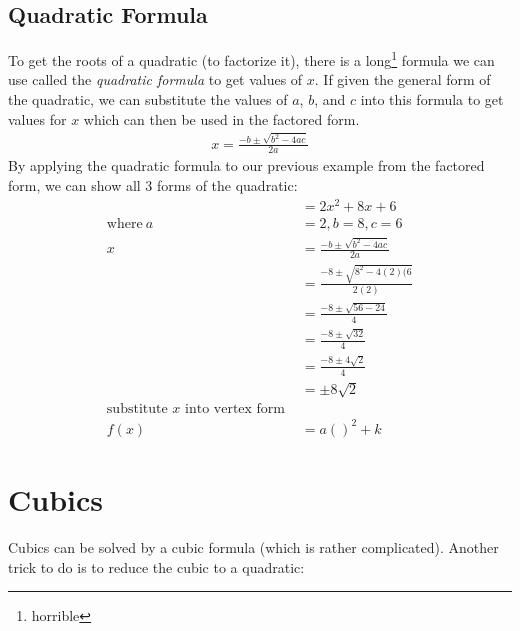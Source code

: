 \subsection{Quadratic Formula}
To get the roots of a quadratic (to factorize it), there is a
long\footnote{horrible} formula we can use called the \emph{quadratic formula}
to get values of $x$. If given the general form of the quadratic, we can
substitute the values of $a$, $b$, and $c$ into this formula to get values for
$x$ which can then be used in the factored form.
\begin{align}
  x = \frac{-b \pm \sqrt{b^2 - 4ac}}{2a}
\end{align}
By applying the quadratic formula to our previous example from the factored
form, we can show all 3 forms of the quadratic:
\begin{align}
  & = 2x^2 + 8x + 6 \nonumber \\
  \text{where}~ a & = 2, b = 8, c = 6 \nonumber \\
  x & = \frac{-b \pm \sqrt{b^2 - 4ac}}{2a} \\
    & = \frac{-8 \pm \sqrt{8^2 - 4(2)(6}}{2(2)} \\
    & = \frac{-8 \pm \sqrt{56 - 24}}{4} \\
    & = \frac{-8 \pm \sqrt{32}}{4} \\
    & = \frac{-8 \pm 4\sqrt{2}}{4} \\    
    & = \pm 8\sqrt{2} \\
    \text{substitute $x$ into vertex form } \\
    f(x) & = a()^2 + k
\end{align}

\section{Cubics}
Cubics can be solved by a cubic formula (which is rather complicated). Another
trick to do is to reduce the cubic to a quadratic:

